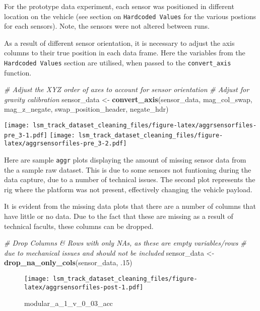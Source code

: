 \documentclass[]{article}
\newenvironment{Shaded}{\begin{snugshade}}{\end{snugshade}}
\newcommand{\CommentTok}[1]{\textcolor[rgb]{0.56,0.35,0.01}{\textit{#1}}}
\newcommand{\FloatTok}[1]{\textcolor[rgb]{0.00,0.00,0.81}{#1}}
\newcommand{\KeywordTok}[1]{\textcolor[rgb]{0.13,0.29,0.53}{\textbf{#1}}}
\newcommand{\NormalTok}[1]{#1}
\newcommand{\StringTok}[1]{\textcolor[rgb]{0.31,0.60,0.02}{#1}}
\begin{document}
For the prototype data experiment, each sensor was positioned in
different location on the vehicle (see section on
\texttt{Hardcoded\ Values} for the various postions for each sensors).
Note, the sensors were not altered between runs.

As a result of different sensor orientation, it is necessary to adjust
the axis columns to their true position in each data frame. Here the
variables from the \texttt{Hardcoded\ Values} section are utilised, when
passed to the \texttt{convert\_axis} function.

\begin{Shaded}
\begin{Highlighting}[]
\CommentTok{# Adjust the XYZ order of axes to account for sensor orientation}
\CommentTok{# Adjust for gravity calibration }
\NormalTok{sensor_data <-}\StringTok{ }\KeywordTok{convert_axis}\NormalTok{(sensor_data, mag_col_swap, mag_z_negate, }
\NormalTok{                            swap_position_header, negate_hdr)}
\end{Highlighting}
\end{Shaded}

\texttt{[image: lsm\_track\_dataset\_cleaning\_files/figure-latex/aggrsensorfiles-pre\_3-1.pdf]}
\texttt{[image: lsm\_track\_dataset\_cleaning\_files/figure-latex/aggrsensorfiles-pre\_3-2.pdf]}

Here are sample \texttt{aggr} plots displaying the amount of missing
sensor data from the a sample raw dataset. This is due to some sensors
not funtioning during the data capture, due to a number of technical
issues. The second plot represents the rig where the platform was not
present, effectively changing the vehicle payload.

It is evident from the missing data plots that there are a number of
columns that have little or no data. Due to the fact that these are
missing as a result of technical facults, these columns can be dropped.

\begin{Shaded}
\begin{Highlighting}[]
\CommentTok{# Drop Columns & Rows with only NAs, as these are empty variables/rows}
\CommentTok{# due to mechanical issues and should not be included}
\NormalTok{sensor_data <-}\StringTok{ }\KeywordTok{drop_na_only_cols}\NormalTok{(sensor_data, }\FloatTok{.15}\NormalTok{)}
\end{Highlighting}
\end{Shaded}

\begin{figure}
\centering
\texttt{[image: lsm\_track\_dataset\_cleaning\_files/figure-latex/aggrsensorfiles-post-1.pdf]}
\caption{modular\_a\_1\_v\_0\_03\_acc}
\end{figure}
\end{document}
